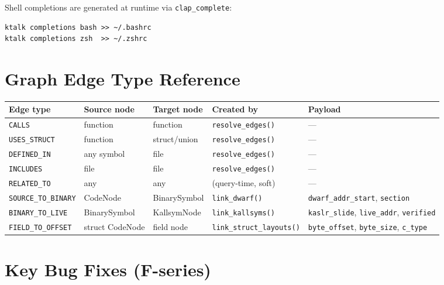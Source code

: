 \documentclass[11pt,a4paper]{article}
\begin{document}
Shell completions are generated at runtime via \texttt{clap\_complete}:

\begin{lstlisting}[language={}]
ktalk completions bash >> ~/.bashrc
ktalk completions zsh  >> ~/.zshrc
\end{lstlisting}

\appendix

\section{Graph Edge Type Reference}
\label{app:edges}

\begin{longtable}{@{}lllll@{}}
\toprule
\textbf{Edge type} & \textbf{Source node} & \textbf{Target node} & \textbf{Created by} & \textbf{Payload} \\
\midrule
\endhead
\texttt{CALLS}            & function   & function         & \texttt{resolve\_edges()} & --- \\
\texttt{USES\_STRUCT}     & function   & struct/union     & \texttt{resolve\_edges()} & --- \\
\texttt{DEFINED\_IN}      & any symbol & file             & \texttt{resolve\_edges()} & --- \\
\texttt{INCLUDES}         & file       & file             & \texttt{resolve\_edges()} & --- \\
\texttt{RELATED\_TO}      & any        & any              & (query-time, soft)  & --- \\
\texttt{SOURCE\_TO\_BINARY} & CodeNode & BinarySymbol    & \texttt{link\_dwarf()}   & \texttt{dwarf\_addr\_start}, \texttt{section} \\
\texttt{BINARY\_TO\_LIVE} & BinarySymbol & KallsymNode   & \texttt{link\_kallsyms()} & \texttt{kaslr\_slide}, \texttt{live\_addr}, \texttt{verified} \\
\texttt{FIELD\_TO\_OFFSET} & struct CodeNode & field node  & \texttt{link\_struct\_layouts()} & \texttt{byte\_offset}, \texttt{byte\_size}, \texttt{c\_type} \\
\bottomrule
\end{longtable}

\section{Key Bug Fixes (F-series)}
\label{app:fixes}
\end{document}
